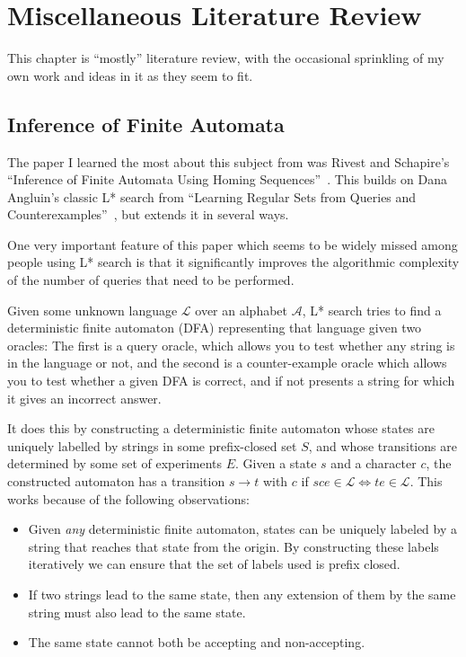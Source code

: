 \chapter{Miscellaneous Literature Review}

This chapter is ``mostly'' literature review,
with the occasional sprinkling of my own work and ideas in it as they seem to fit.


\section{Inference of Finite Automata}\label{sec:langinference}

The paper I learned the most about this subject from was Rivest and Schapire's ``Inference of Finite Automata Using Homing Sequences''~\cite{DBLP:journals/iandc/RivestS93}.
This builds on Dana Angluin's classic L* search from ``Learning Regular Sets from Queries and Counterexamples''~\cite{DBLP:journals/iandc/Angluin87},
but extends it in several ways.

One very important feature of this paper which seems to be widely missed among people using L* search is that it significantly improves the algorithmic complexity of the number of queries that need to be performed.

Given some unknown language \(\mathcal{L}\) over an alphabet \(\mathcal{A}\),
L* search tries to find a deterministic finite automaton (DFA) representing that language given two oracles:
The first is a query oracle,
which allows you to test whether any string is in the language or not,
and the second is a counter-example oracle which allows you to test whether a given DFA is correct,
and if not presents a string for which it gives an incorrect answer.

It does this by constructing a deterministic finite automaton whose states are uniquely labelled by strings in some prefix-closed set \(S\),
and whose transitions are determined by some set of experiments \(E\).
Given a state \(s\) and a character \(c\),
the constructed automaton has a transition \(s \to t\) with \(c\) if \(sce \in \mathcal{L} \iff te \in \mathcal{L}\).
This works because of the following observations:

\begin{itemize}
\item Given \emph{any} deterministic finite automaton,
states can be uniquely labeled by a string that reaches that state from the origin.
By constructing these labels iteratively we can ensure that the set of labels used is prefix closed.
\item If two strings lead to the same state,
then any extension of them by the same string must also lead to the same state.
\item The same state cannot both be accepting and non-accepting.
\end{itemize}

